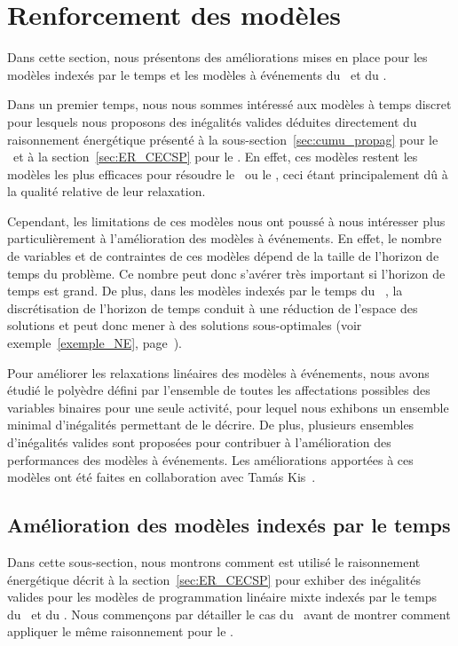 \section{Renforcement des modèles}
\label{sec:amelioration_modele}
Dans cette section, nous présentons des améliorations mises en place
pour les modèles indexés par le temps et les modèles à événements du
\RCPSP~et du \CECSP. 

Dans un premier temps, nous nous sommes intéressé aux modèles à temps
discret pour lesquels nous proposons des inégalités valides déduites
directement du raisonnement énergétique présenté à la
sous-section~\ref{sec:cumu_propag} pour le \CUSP~et à la
section~\ref{sec:ER_CECSP} pour le \CECSP. En effet, ces modèles
restent les modèles les plus efficaces pour résoudre le \CECSP~ou le
\RCPSP, ceci étant principalement dû à la qualité relative de leur
relaxation.

Cependant, les limitations de ces modèles nous ont poussé à nous
intéresser plus particulièrement à l'amélioration des modèles à
événements. En effet, le nombre de variables et de contraintes de ces
modèles dépend de la taille de l'horizon de temps du problème. Ce
nombre peut donc s'avérer très important si l'horizon de temps est grand.
De plus, dans les modèles indexés par le temps du \CECSP~, la
discrétisation de l'horizon de temps conduit à une réduction de
l'espace des solutions et peut donc mener à des solutions
sous-optimales (voir exemple~\ref{exemple_NE},
page~\pageref{exemple_NE}). 

Pour améliorer les relaxations linéaires des modèles à événements, nous
avons étudié le polyèdre défini par l'ensemble de toutes les
affectations possibles des variables binaires pour une seule activité,
pour lequel nous exhibons un ensemble minimal d'inégalités permettant
de le décrire. De plus, plusieurs ensembles d'inégalités valides sont
proposées pour contribuer à l'amélioration des performances des
modèles à événements. Les améliorations apportées à ces modèles ont
été faites en collaboration avec Tam{\'a}s Kis~\cite{LAASreport}.
 
\subsection{Amélioration des modèles indexés par le temps}
\label{sec:ER_TI}

Dans cette sous-section, nous montrons comment est utilisé le
raisonnement énergétique décrit à la section~\ref{sec:ER_CECSP} pour
exhiber des inégalités valides pour les modèles de programmation
linéaire mixte indexés par le temps du \RCPSP~et du \CECSP. Nous
commençons par détailler le cas du \CECSP~avant de montrer comment
appliquer le même raisonnement pour le \RCPSP.

